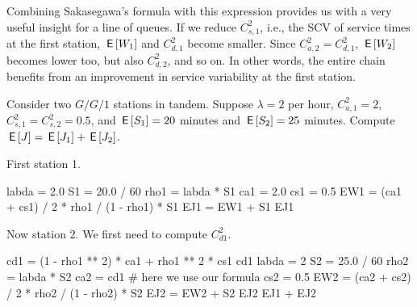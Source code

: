 Combining Sakasegawa's formula with this expression provides us with a  very useful insight for a line of queues.
If we reduce $C^2_{s,1}$, i.e., the SCV of service times at the first station,   $\,\mathsf{E}\left[W_1\right]$ and $C^2_{d,1}$ become smaller. Since  $C^2_{a,2}=C^2_{d,1}$, $\,\mathsf{E}\left[W_2\right]$ becomes lower too, but also $C^2_{d,2}$, and so on.
In other words, the entire chain benefits from an improvement in service variability at  the first station.



\begin{exercise}\label{ex:l-127}
Consider two $G/G/1$ stations in tandem.
Suppose $\lambda=2$ per hour, $C_{a,1}^2=2$, $C_{s,1}^2=C_{s,2}^2 = 0.5$, and $\,\mathsf{E}\left[S_1\right]=20$ minutes and $\,\mathsf{E}\left[S_2\right]=25$ minutes.
Compute $\,\mathsf{E}\left[J\right] = \,\mathsf{E}\left[J_1\right]+ \,\mathsf{E}\left[J_2\right]$.
\begin{solution}
First station 1.
\begin{pyconsole}
labda = 2.0
S1 = 20.0 / 60
rho1 = labda * S1
ca1 = 2.0
cs1 = 0.5
EW1 = (ca1 + cs1) / 2 * rho1 / (1 - rho1) * S1
EJ1 = EW1 + S1
EJ1
\end{pyconsole}

Now station 2. We first need to compute $C_{d1}^2$.

\begin{pyconsole}
cd1 = (1 - rho1 ** 2) * ca1 + rho1 ** 2 * cs1
cd1
labda = 2
S2 = 25.0 / 60
rho2 = labda * S2
ca2 = cd1  # here we use our formula
cs2 = 0.5
EW2 = (ca2 + cs2) / 2 * rho2 / (1 - rho2) * S2
EJ2 = EW2 + S2
EJ2
EJ1 + EJ2
\end{pyconsole}

\end{solution}
\end{exercise}





